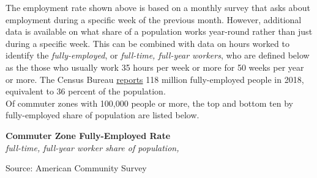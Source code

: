 \documentclass{report}
\begin{document}
{{{{{{{\begin{minipage}{0.76\textwidth}
\vspace{4mm}

\small The employment rate shown above is based on a monthly survey that asks about employment during a specific week of the previous month. However, additional data is available on what share of a population works year-round rather than just during a specific week. This can be combined with data on hours worked to identify the \textit{fully-employed}, or \textit{full-time, full-year workers}, who are defined below as the those who usually work 35 hours per week or more for 50 weeks per year or more. The Census Bureau \href{https://www.census.gov/data/tables/time-series/demo/income-poverty/cps-pinc/pinc-01.html#par_textimage_14}{reports} 118 million fully-employed people in 2018, equivalent to 36 percent of the population. \\

 Of commuter zones with 100,000 people or more, the top and bottom ten by fully-employed share of population are listed below.
\end{minipage}

\vspace{3mm}

\begin{minipage}{0.52\textwidth}


\noindent \normalsize \textbf{Commuter Zone Fully-Employed Rate}\\
\footnotesize{\textit{full-time, full-year worker share of population, }}\\

\vspace{-3mm}

\hspace{-11mm} 

\vspace{-1mm}
\footnotesize{Source: American Community Survey}
\end{minipage} \hspace{3mm}
\begin{minipage}{0.24\textwidth}

\vspace{1mm}

\footnotesize 


\end{minipage}

\newpage

\begin{minipage}{0.76\textwidth} 


\end{minipage}}}}}}}}
\end{document}
